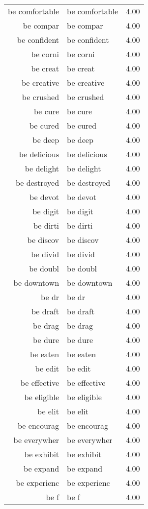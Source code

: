 \begin{table}[ht]
\begin{tabular}{rlr}
  be comfortable & be comfortable & 4.00 \\ 
  be compar & be compar & 4.00 \\ 
  be confident & be confident & 4.00 \\ 
  be corni & be corni & 4.00 \\ 
  be creat & be creat & 4.00 \\ 
  be creative & be creative & 4.00 \\ 
  be crushed & be crushed & 4.00 \\ 
  be cure & be cure & 4.00 \\ 
  be cured & be cured & 4.00 \\ 
  be deep & be deep & 4.00 \\ 
  be delicious & be delicious & 4.00 \\ 
  be delight & be delight & 4.00 \\ 
  be destroyed & be destroyed & 4.00 \\ 
  be devot & be devot & 4.00 \\ 
  be digit & be digit & 4.00 \\ 
  be dirti & be dirti & 4.00 \\ 
  be discov & be discov & 4.00 \\ 
  be divid & be divid & 4.00 \\ 
  be doubl & be doubl & 4.00 \\ 
  be downtown & be downtown & 4.00 \\ 
  be dr & be dr & 4.00 \\ 
  be draft & be draft & 4.00 \\ 
  be drag & be drag & 4.00 \\ 
  be dure & be dure & 4.00 \\ 
  be eaten & be eaten & 4.00 \\ 
  be edit & be edit & 4.00 \\ 
  be effective & be effective & 4.00 \\ 
  be eligible & be eligible & 4.00 \\ 
  be elit & be elit & 4.00 \\ 
  be encourag & be encourag & 4.00 \\ 
  be everywher & be everywher & 4.00 \\ 
  be exhibit & be exhibit & 4.00 \\ 
  be expand & be expand & 4.00 \\ 
  be experienc & be experienc & 4.00 \\ 
  be f & be f & 4.00 \\ 

\end{tabular}
\end{table}
